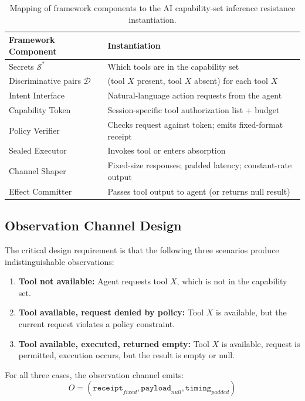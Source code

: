 \documentclass[11pt,a4paper]{article}
\begin{document}
\begin{table}[h]
\centering
\begin{tabular}{@{}p{4cm}p{8.5cm}@{}}
\toprule
\textbf{Framework Component} & \textbf{Instantiation} \\
\midrule
Secrets $\mathcal{S}^*$ & Which tools are in the capability set \\
Discriminative pairs $\mathcal{D}$ & (tool $X$ present, tool $X$ absent) for each tool $X$ \\
Intent Interface & Natural-language action requests from the agent \\
Capability Token & Session-specific tool authorization list + budget \\
Policy Verifier & Checks request against token; emits fixed-format receipt \\
Sealed Executor & Invokes tool or enters absorption \\
Channel Shaper & Fixed-size responses; padded latency; constant-rate output \\
Effect Committer & Passes tool output to agent (or returns null result) \\
\bottomrule
\end{tabular}
\caption{Mapping of framework components to the AI capability-set inference resistance instantiation.}
\label{tab:mapping}
\end{table}

\subsection{Observation Channel Design}

The critical design requirement is that the following three scenarios produce indistinguishable observations:

\begin{enumerate}
  \item \textbf{Tool not available:} Agent requests tool $X$, which is not in the capability set.
  \item \textbf{Tool available, request denied by policy:} Tool $X$ is available, but the current request violates a policy constraint.
  \item \textbf{Tool available, executed, returned empty:} Tool $X$ is available, request is permitted, execution occurs, but the result is empty or null.
\end{enumerate}

For all three cases, the observation channel emits:
\begin{equation}
O = (\texttt{receipt}_{fixed}, \texttt{payload}_{null}, \texttt{timing}_{padded})
\end{equation}
\end{document}
